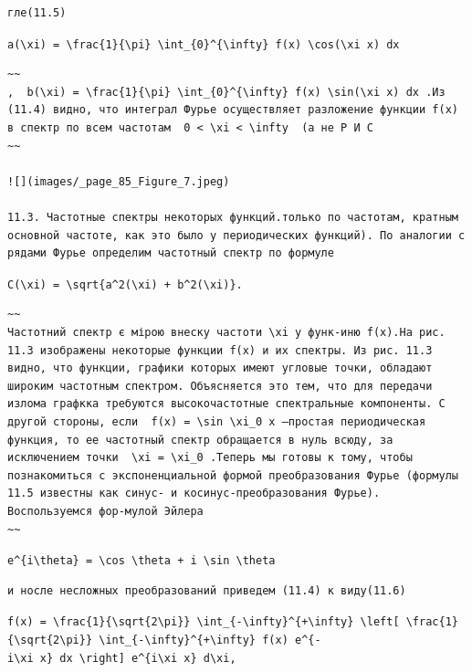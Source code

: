 \documentclass[
  ukrainian,
]{article}
\begin{document}
\begin{verbatim}
гле(11.5)
\end{verbatim}

\texttt{a(\textbackslash{}xi)\ =\ \textbackslash{}frac\{1\}\{\textbackslash{}pi\}\ \textbackslash{}int\_\{0\}\^{}\{\textbackslash{}infty\}\ f(x)\ \textbackslash{}cos(\textbackslash{}xi\ x)\ dx}

\begin{verbatim}
~~
,  b(\xi) = \frac{1}{\pi} \int_{0}^{\infty} f(x) \sin(\xi x) dx .Из (11.4) видно, что интеграл Фурье осуществляет разложение функции f(x) в спектр по всем частотам  0 < \xi < \infty  (а не Р И С
~~

![](images/_page_85_Figure_7.jpeg)

11.3. Частотные спектры некоторых функций.только по частотам, кратным основной частоте, как это было у периодических функций). По аналогии с рядами Фурье определим частотный спектр по формуле
\end{verbatim}

\texttt{C(\textbackslash{}xi)\ =\ \textbackslash{}sqrt\{a\^{}2(\textbackslash{}xi)\ +\ b\^{}2(\textbackslash{}xi)\}.}

\begin{verbatim}
~~
Частотний спектр є мірою внеску частоти \xi у функ-иню f(x).На рис. 11.3 изображены некоторые функции f(x) и их спектры. Из рис. 11.3 видно, что функции, графики которых имеют угловые точки, обладают широким частотным спектром. Объясняется это тем, что для передачи излома графкка требуются высокочастотные спектральные компоненты. С другой стороны, если  f(x) = \sin \xi_0 x —простая периодическая функция, то ее частотный спектр обращается в нуль всюду, за исключением точки  \xi = \xi_0 .Теперь мы готовы к тому, чтобы познакомиться с экспоненциальной формой преобразования Фурье (формулы 11.5 известны как синус- и косинус-преобразования Фурье). Воспользуемся фор-мулой Эйлера
~~
\end{verbatim}

\texttt{e\^{}\{i\textbackslash{}theta\}\ =\ \textbackslash{}cos\ \textbackslash{}theta\ +\ i\ \textbackslash{}sin\ \textbackslash{}theta}

\begin{verbatim}
и носле несложных преобразований приведем (11.4) к виду(11.6)
\end{verbatim}

\texttt{f(x)\ =\ \textbackslash{}frac\{1\}\{\textbackslash{}sqrt\{2\textbackslash{}pi\}\}\ \textbackslash{}int\_\{-\textbackslash{}infty\}\^{}\{+\textbackslash{}infty\}\ \textbackslash{}left{[}\ \textbackslash{}frac\{1\}\{\textbackslash{}sqrt\{2\textbackslash{}pi\}\}\ \textbackslash{}int\_\{-\textbackslash{}infty\}\^{}\{+\textbackslash{}infty\}\ f(x)\ e\^{}\{-i\textbackslash{}xi\ x\}\ dx\ \textbackslash{}right{]}\ e\^{}\{i\textbackslash{}xi\ x\}\ d\textbackslash{}xi,}
\end{document}
